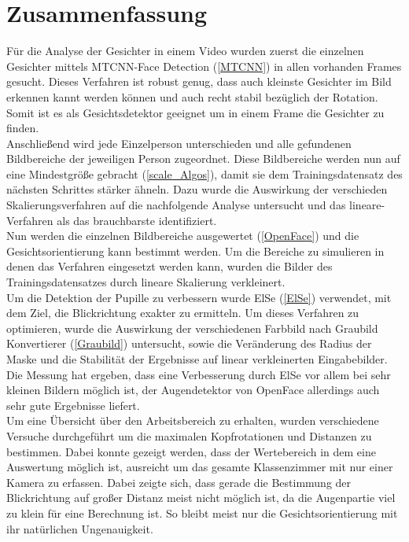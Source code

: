 \section{Zusammenfassung}
Für die Analyse der Gesichter in einem Video wurden zuerst die einzelnen Gesichter mittels MTCNN-Face Detection (\autoref{MTCNN}) in allen vorhanden Frames gesucht. Dieses Verfahren ist robust genug, dass auch kleinste Gesichter im Bild erkennen kannt werden können und auch recht stabil bezüglich der Rotation. Somit ist es als Gesichtsdetektor geeignet um in einem Frame die Gesichter zu finden.\\
Anschließend wird jede Einzelperson unterschieden und alle gefundenen Bildbereiche der jeweiligen Person zugeordnet. Diese Bildbereiche werden nun auf eine Mindestgröße gebracht (\autoref{scale_Algos}), damit sie dem Trainingsdatensatz des nächsten Schrittes stärker ähneln. Dazu wurde die Auswirkung der verschieden Skalierungsverfahren auf die nachfolgende Analyse untersucht und das lineare-Verfahren als das brauchbarste identifiziert.\\
Nun werden die einzelnen Bildbereiche ausgewertet (\autoref{OpenFace}) und die Gesichtsorientierung kann bestimmt werden. Um die Bereiche zu simulieren in denen das Verfahren eingesetzt werden kann, wurden die Bilder des Trainingsdatensatzes durch lineare Skalierung verkleinert.\\
Um die Detektion der Pupille zu verbessern wurde ElSe (\autoref{ElSe}) verwendet, mit dem Ziel, die Blickrichtung exakter zu ermitteln. Um dieses Verfahren zu optimieren, wurde die Auswirkung der verschiedenen Farbbild nach Graubild Konvertierer (\autoref{Graubild}) untersucht, sowie die Veränderung des Radius der Maske und die Stabilität der Ergebnisse auf linear verkleinerten Eingabebilder. Die Messung hat ergeben, dass eine Verbesserung durch ElSe vor allem bei sehr kleinen Bildern möglich ist, der Augendetektor von OpenFace allerdings auch sehr gute Ergebnisse liefert.\\
Um eine Übersicht über den Arbeitsbereich zu erhalten, wurden verschiedene Versuche durchgeführt um die maximalen Kopfrotationen und Distanzen zu bestimmen. Dabei konnte gezeigt werden, dass der Wertebereich in dem eine Auswertung möglich ist, ausreicht um das gesamte Klassenzimmer mit nur einer Kamera zu erfassen. Dabei zeigte sich, dass gerade die Bestimmung der Blickrichtung auf großer Distanz meist nicht möglich ist, da die Augenpartie viel zu klein für eine Berechnung ist. So bleibt meist nur die Gesichtsorientierung mit ihr natürlichen Ungenauigkeit.\\
